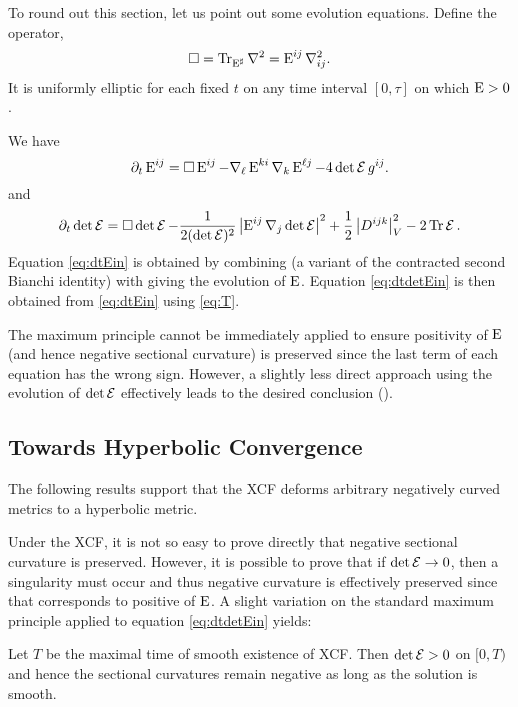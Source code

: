 \documentclass[a4paper,12pt]{amsart}
\begin{document}
To round out this section, let us point out some evolution equations. Define the operator,
\begin{equation}
\label{eq:box}
\Box = \operatorname{Tr}_{\operatorname{E}^{\sharp}} \nabla^2 = \operatorname{E}^{ij} \nabla^2_{ij}.
\end{equation}
It is uniformly elliptic for each fixed \(t\) on any time interval \([0, \tau]\) on which \(\operatorname{E} > 0\).

We have
\begin{equation}
\label{eq:dtEin}
\partial_t \operatorname{E}^{ij} = \Box \operatorname{E}^{ij} - \nabla_{\ell} \operatorname{E}^{ki} \nabla_k \operatorname{E}^{\ell j} - 4 \det \operatorname{\mathcal{E}} g^{ij}.
\end{equation}
and
\begin{equation}
\label{eq:dtdetEin}
\partial_t \det \operatorname{\mathcal{E}} = \Box \det \operatorname{\mathcal{E}} - \frac{1}{2(\det\operatorname{\mathcal{E}})^2} \left\lvert{\operatorname{E}^{ij} \nabla_j \det \operatorname{\mathcal{E}}}\right\rvert^2 + \frac{1}{2}\left\lvert{D^{ijk}}\right\rvert_V^2 - 2\operatorname{Tr}\operatorname{\mathcal{E}}.
\end{equation}
Equation \eqref{eq:dtEin} is obtained by combining \cite[Lemma 1(a)]{MR2055396} (a variant of the contracted second Bianchi identity) with \cite[Lemma 5]{MR2055396} giving the evolution of \(\operatorname{E}\). Equation \eqref{eq:dtdetEin} is then obtained from \eqref{eq:dtEin} using \eqref{eq:T}.

The maximum principle cannot be immediately applied to ensure positivity of \(\operatorname{E}\) (and hence negative sectional curvature) is preserved since the last term of each equation has the wrong sign. However, a slightly less direct approach using the evolution of \(\det \operatorname{\mathcal{E}}\) effectively leads to the desired conclusion ().

\subsection{Towards Hyperbolic Convergence}
\label{subsec:xcf_hyperbolic_convergence}

The following results support  that the XCF deforms arbitrary negatively curved metrics to a hyperbolic metric.

Under the XCF, it is not so easy to prove directly that negative sectional curvature is preserved. However, it is possible to prove that if \(\det \operatorname{\mathcal{E}} \to 0\), then a singularity must occur and thus negative curvature is effectively preserved since that corresponds to positive of \(\operatorname{E}\). A slight variation on the standard maximum principle applied to equation \eqref{eq:dtdetEin} yields:

\begin{prop}[{\cite[p. 8]{MR2055396}}]
\label{prop:negative_perserved}

Let $T$ be the maximal time of smooth existence of XCF. Then \(\det \operatorname{\mathcal{E}} > 0\) on \([0, T)\) and hence the sectional curvatures remain negative as long as the solution is smooth.
\end{prop}
\end{document}
